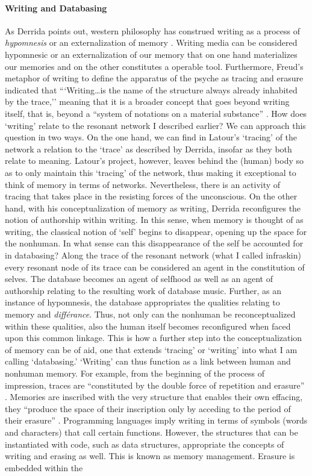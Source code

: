 \paragraph{Writing and Databasing}
As Derrida points out, western philosophy has construed writing as a process of \textit{hypomnesis} or an externalization of memory \parencite[221]{Der78:Wri}. Writing media can be considered hypomnesic or an externalization of our memory that on one hand materializes our memories and on the other constitutes a operable tool. Furthermore, Freud's metaphor of writing to define the apparatus of the psyche as tracing and erasure indicated that ```Writing\dots is the name of the structure always already inhabited by the trace,'' meaning that it is a broader concept that goes beyond writing itself, that is, beyond a ``system of notations on a material sub­stance'' \parencite[xxxix]{Der76:Of}. How does `writing' relate to the resonant network I described earlier? We can approach this question in two ways. On the one hand, we can find in Latour's `tracing' of the network a relation to the `trace' as described by Derrida, insofar as they both relate to meaning. Latour's project, however, leaves behind the (human) body so as to only maintain this `tracing' of the network, thus making it exceptional to think of memory in terms of networks. Nevertheless, there is an activity of tracing that takes place in the resisting forces of the unconscious. On the other hand, with his conceptualization of memory as writing, Derrida reconfigures the notion of authorship within writing. In this sense, when memory is thought of as writing, the classical notion of `self' begins to disappear, opening up the space for the nonhuman. In what sense can this disappearance of the self be accounted for in databasing? Along the trace of the resonant network (what I called infraskin) every resonant node of its trace can be considered an agent in the constitution of selves. The database becomes an agent of selfhood as well as an agent of authorship relating to the resulting work of database music. Further, as an instance of hypomnesis, the database appropriates the qualities relating to memory and \textit{différance}. Thus, not only can the nonhuman be reconceptualized within these qualities, also the human itself becomes reconfigured when faced upon this common linkage. This is how a further step into the conceptualization of memory can be of aid, one that extends `tracing' or `writing' into what I am calling `databasing.' `Writing' can thus function as a link between human and nonhuman memory. For example, from the beginning of the process of impression, traces are ``constituted by the double force of repetition and erasure'' \parencite[226]{Der78:Wri}. Memories are inscribed with the very structure that enables their own effacing, they ``produce the space of their inscription only by acceding to the period of their erasure'' \parencite[226]{Der78:Wri}. Programming languages imply writing in terms of symbols (words and characters) that call certain functions. However, the structures that can be instantiated with code, such as data structures, appropriate the concepts of writing and erasing as well. This is known as memory management. Erasure is embedded within the 